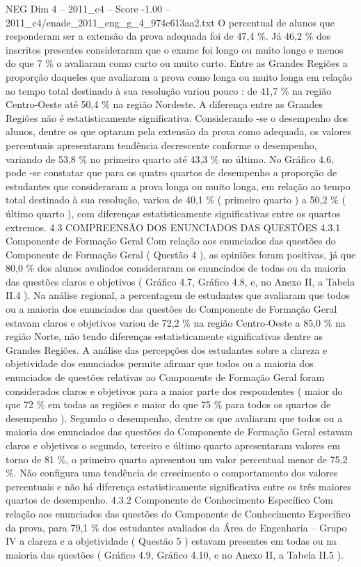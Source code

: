 \begin{textsample}{NEG Dim 4 – 2011\_c4 – Score -1.00 – 2011\_c4/enade\_2011\_eng\_g\_4\_974c613aa2.txt}
O percentual de alunos que responderam ser a extensão da prova adequada foi de 47,4 \%.
Já 46,2 \% dos inscritos presentes consideraram que o exame foi longo ou muito longo e menos do que 7 \% o avaliaram como curto ou muito curto.
Entre as Grandes Regiões a proporção daqueles que avaliaram a prova como longa ou muito longa em relação ao tempo total destinado à sua resolução variou pouco : de 41,7 \% na região Centro-Oeste até 50,4 \% na região Nordeste.
A diferença entre as Grandes Regiões não é estatisticamente significativa.
Considerando -se o desempenho dos alunos, dentre os que optaram pela extensão da prova como adequada, os valores percentuais apresentaram tendência decrescente conforme o desempenho, variando de 53,8 \% no primeiro quarto até 43,3 \% no último.
No Gráfico 4.6, pode -se constatar que para os quatro quartos de desempenho a proporção de estudantes que consideraram a prova longa ou muito longa, em relação ao tempo total destinado à sua resolução, variou de 40,1 \% ( primeiro quarto ) a 50,2 \% ( último quarto ), com diferenças estatisticamente significativas entre os quartos extremos. 4.3 COMPREENSÃO DOS ENUNCIADOS DAS QUESTÕES 4.3.1 Componente de Formação Geral Com relação aos enunciados das questões do Componente de Formação Geral ( Questão 4 ), as opiniões foram positivas, já que 80,0 \% dos alunos avaliados consideraram os enunciados de todas ou da maioria das questões claros e objetivos ( Gráfico 4.7, Gráfico 4.8, e, no Anexo II, a Tabela II.4 ).
Na análise regional, a percentagem de estudantes que avaliaram que todos ou a maioria dos enunciados das questões do Componente de Formação Geral estavam claros e objetivos variou de 72,2 \% na região Centro-Oeste a 85,0 \% na região Norte, não tendo diferenças estatisticamente significativas dentre as Grandes Regiões.
A análise das percepções dos estudantes sobre a clareza e objetividade dos enunciados permite afirmar que todos ou a maioria dos enunciados de questões relativas ao Componente de Formação Geral foram considerados claros e objetivos para a maior parte dos respondentes ( maior do que 72 \% em todas as regiões e maior do que 75 \% para todos os quartos de desempenho ).
Segundo o desempenho, dentre os que avaliaram que todos ou a maioria dos enunciados das questões do Componente de Formação Geral estavam claros e objetivos o segundo, terceiro e último quarto apresentaram valores em torno de 81 \%, o primeiro quarto apresentou um valor percentual menor de 75,2 \%.
Não configura uma tendência de crescimento o comportamento dos valores percentuais e não há diferença estatisticamente significativa entre os três maiores quartos de desempenho. 4.3.2 Componente de Conhecimento Específico Com relação aos enunciados das questões do Componente de Conhecimento Específico da prova, para 79,1 \% dos estudantes avaliados da Área de Engenharia – Grupo IV a clareza e a objetividade ( Questão 5 ) estavam presentes em todas ou na maioria das questões ( Gráfico 4.9, Gráfico 4.10, e no Anexo II, a Tabela II.5 ).

\end{textsample}
